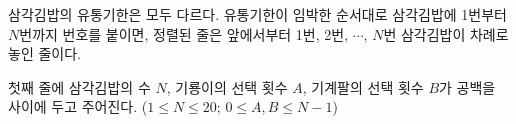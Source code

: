 삼각김밥의 유통기한은 모두 다르다. 유통기한이 임박한 순서대로 삼각김밥에 1번부터 $N$번까지 번호를 붙이면, 정렬된 줄은 앞에서부터 1번, 2번, $\cdots$, $N$번 삼각김밥이 차례로 놓인 줄이다.

첫째 줄에 삼각김밥의 수 $N$, 기룡이의 선택 횟수 $A$, 기계팔의 선택 횟수 $B$가 공백을 사이에 두고 주어진다. ($1 \le N \le 20$; $0 \le A,B \le N-1$)